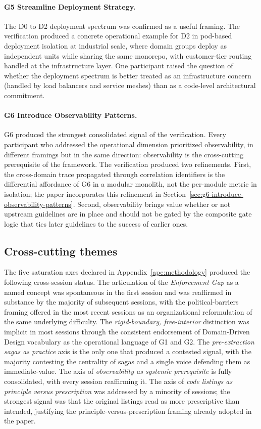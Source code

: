 \paragraph*{G5 Streamline Deployment Strategy.} The D0 to D2 deployment spectrum was confirmed as a useful framing. The verification produced a concrete operational example for D2 in pod-based deployment isolation at industrial scale, where domain groups deploy as independent units while sharing the same monorepo, with customer-tier routing handled at the infrastructure layer. One participant raised the question of whether the deployment spectrum is better treated as an infrastructure concern (handled by load balancers and service meshes) than as a code-level architectural commitment.

\paragraph*{G6 Introduce Observability Patterns.} G6 produced the strongest consolidated signal of the verification. Every participant who addressed the operational dimension prioritized observability, in different framings but in the same direction: observability is the cross-cutting prerequisite of the framework. The verification produced two refinements. First, the cross-domain trace propagated through correlation identifiers is the differential affordance of G6 in a modular monolith, not the per-module metric in isolation; the paper incorporates this refinement in Section~\ref{sec:g6-introduce-observability-patterns}. Second, observability brings value whether or not upstream guidelines are in place and should not be gated by the composite gate logic that ties later guidelines to the success of earlier ones.

\subsection*{Cross-cutting themes}

The five saturation axes declared in Appendix~\ref{ape:methodology} produced the following cross-session status. The articulation of the \emph{Enforcement Gap} as a named concept was spontaneous in the first session and was reaffirmed in substance by the majority of subsequent sessions, with the political-barriers framing offered in the most recent sessions as an organizational reformulation of the same underlying difficulty. The \emph{rigid-boundary, free-interior} distinction was implicit in most sessions through the consistent endorsement of Domain-Driven Design vocabulary as the operational language of G1 and G2. The \emph{pre-extraction sagas as practice} axis is the only one that produced a contested signal, with the majority contesting the centrality of sagas and a single voice defending them as immediate-value. The axis of \emph{observability as systemic prerequisite} is fully consolidated, with every session reaffirming it. The axis of \emph{code listings as principle versus prescription} was addressed by a minority of sessions; the strongest signal was that the original listings read as more prescriptive than intended, justifying the principle-versus-prescription framing already adopted in the paper.

